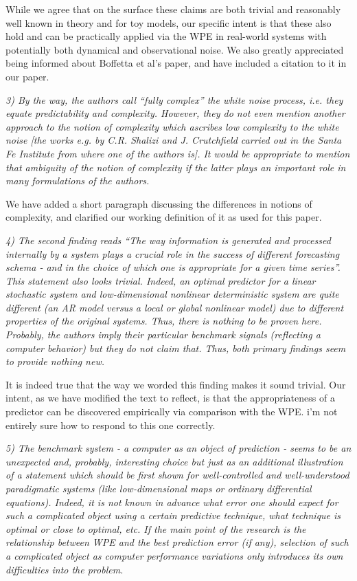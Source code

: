 \documentclass[12pt]{article}
\newcommand{\alert}[1]{{\color{red}#1}}
\begin{document}
While we agree that on the surface these claims are both trivial and reasonably
well known in theory and for toy models, our specific intent is that these also
hold and can be practically applied via the WPE in real-world systems with
potentially both dynamical and observational noise. We also greatly appreciated
being informed about Boffetta et al's paper, and have included a citation to it
in our paper.

\emph{3) By the way, the authors call ``fully complex'' the white noise process,
i.e. they equate predictability and complexity. However, they do not even
mention another approach to the notion of complexity which ascribes low
complexity to the white noise [the works e.g. by C.R. Shalizi and J. Crutchfield
carried out in the Santa Fe Institute from where one of the authors is]. It
would be appropriate to mention that ambiguity of the notion of complexity if
the latter plays an important role in many formulations of the authors.}

We have added a short paragraph discussing the differences in notions of
complexity, and clarified our working definition of it as used for this paper.

\emph{4) The second finding reads ``The way information is generated and
processed internally by a system plays a crucial role in the success of
different forecasting schema - and in the choice of which one is appropriate for
a given time series''. This statement also looks trivial. Indeed, an optimal
predictor for a linear stochastic system and low-dimensional nonlinear
deterministic system are quite different (an AR model versus a local or global
nonlinear model) due to different properties of the original systems. Thus,
there is nothing to be proven here. Probably, the authors imply their particular
benchmark signals (reflecting a computer behavior) but they do not claim that.
Thus, both primary findings seem to provide nothing new.}

It is indeed true that the way we worded this finding makes it sound trivial.
Our intent, as we have modified the text to reflect, is that the appropriateness
of a predictor can be discovered empirically via comparison with the WPE.
\alert{i'm not entirely sure how to respond to this one correctly.}

\emph{5) The benchmark system - a computer as an object of prediction - seems to
be an unexpected and, probably, interesting choice but just as an additional
illustration of a statement which should be first shown for well-controlled and
well-understood paradigmatic systems (like low-dimensional maps or ordinary
differential equations). Indeed, it is not known in advance what error one
should expect for such a complicated object using a certain predictive
technique, what technique is optimal or close to optimal, etc. If the main point
of the research is the relationship between WPE and the best prediction error
(if any), selection of such a complicated object as computer performance
variations only introduces its own difficulties into the problem.}
\end{document}
